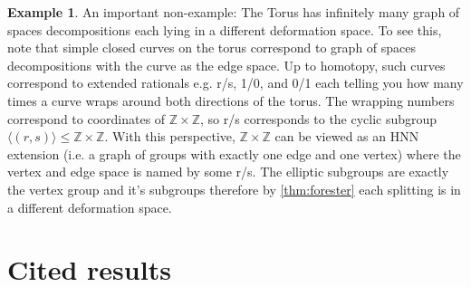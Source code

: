 \documentclass[12pt,parskip=full]{report}
\theoremstyle{plain}
\theoremstyle{definition}
\newtheorem{exa}[thm]{Example}
\begin{document}
\begin{exa}

An important non-example: The Torus has infinitely many graph of spaces decompositions each lying in a different deformation space. To see this, note that simple closed curves on the torus correspond to graph of spaces decompositions with the curve as the edge space. Up to homotopy, such curves correspond to extended rationals e.g. r/s, 1/0, and 0/1 each telling you how many times a curve wraps around both directions of the torus. The wrapping numbers correspond to coordinates of \(\mathbb{Z}\times \mathbb{Z}\), so r/s corresponds to the cyclic subgroup \(\langle (r,s)\rangle\leq \mathbb{Z}\times \mathbb{Z}\). With this perspective, \(\mathbb{Z}\times \mathbb{Z}\) can be viewed as an HNN extension (i.e. a graph of groups with exactly one edge and one vertex) where the vertex and edge space is named by some r/s. The elliptic subgroups are exactly the vertex group and it's subgroups therefore by  \ref{thm:forester} each splitting is in a different deformation space.











\end{exa}


\section{Cited results}
\end{document}
